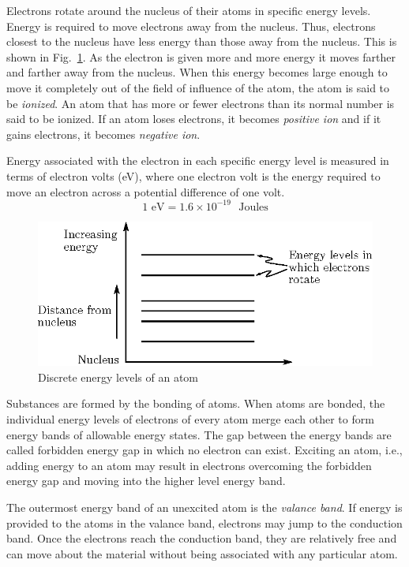 Electrons rotate around the nucleus of their atoms in specific energy levels. Energy is required to move electrons away from the nucleus. Thus, electrons closest to the nucleus have less energy than those away from the nucleus. This is shown in Fig.~\ref{fig1.1}. As the electron is given more and more energy it moves farther and farther away from the nucleus. When this energy becomes large enough to move it completely out of the field of influence of the atom, the atom is said to be {\em ionized}. An atom that has more or fewer electrons than its normal number is said to be ionized. If an atom loses electrons, it becomes {\em positive ion} and if it gains electrons, it becomes {\em negative ion}.

Energy associated with the electron in each specific energy level is measured in terms of electron volts (eV), where one electron volt is the energy required to move an electron across a potential difference of one volt.
$$
1\text{~eV}=1.6\times 10^{-19}\text{~~Joules}
$$
\begin{figure}[H]
\centering
\includegraphics{chap1/fig1.1.eps}
\caption{Discrete energy levels of an atom}\label{fig1.1}
\end{figure}

Substances are formed by the bonding of atoms. When atoms are bonded, the individual energy levels of electrons of every atom merge each other to form energy bands of allowable energy states. The gap between the energy bands are called forbidden energy gap in which no electron can exist. Exciting an atom, i.e., adding energy to an atom may result in electrons overcoming the forbidden energy gap and moving into the higher level energy band.

The outermost energy band of an unexcited atom is the {\em valance band}. If energy is provided to the atoms in the valance band, electrons may jump to the conduction band. Once the electrons reach the conduction band, they are relatively free and can move about the material without being associated with any particular atom.

